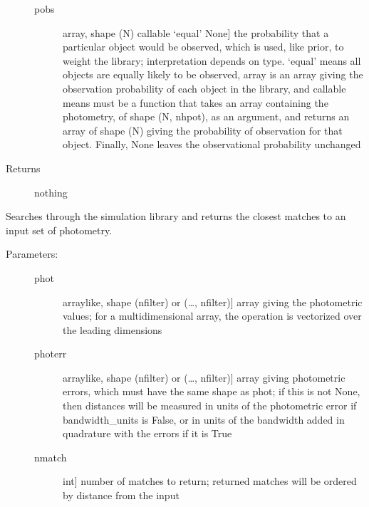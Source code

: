 \documentclass[letterpaper,10pt,english]{sphinxmanual}
\begin{document}
\begin{fulllineitems}
\begin{fulllineitems}
\begin{description}
\begin{description}
\item[{pobs}] \leavevmode{[}array, shape (N) \textbar{} callable \textbar{} ‘equal’ \textbar{} None{]}
the probability that a particular object would be observed,
which is used, like prior, to weight the library;
interpretation depends on type. ‘equal’ means all objects are
equally likely to be observed, array is an array giving the
observation probability of each object in the library, and
callable means must be a function that takes an array
containing the photometry, of shape (N, nhpot), as an
argument, and returns an array of shape (N) giving the
probability of observation for that object. Finally,
None leaves the observational probability unchanged

\end{description}

\item[{Returns}] \leavevmode
nothing

\end{description}

\end{fulllineitems}


\begin{fulllineitems}
\label{\detokenize{cluster_slug:slugpy.cluster_slug.cluster_slug.bestmatch}}
Searches through the simulation library and returns the closest
matches to an input set of photometry.
\begin{description}
\item[{Parameters:}] \leavevmode\begin{description}
\item[{phot}] \leavevmode{[}arraylike, shape (nfilter) or (…, nfilter){]}
array giving the photometric values; for a
multidimensional array, the operation is vectorized over
the leading dimensions

\item[{photerr}] \leavevmode{[}arraylike, shape (nfilter) or (…, nfilter){]}
array giving photometric errors, which must have the
same shape as phot; if this is not None,
then distances will be measured in units of the
photometric error if bandwidth\_units is False, or in
units of the bandwidth added in quadrature with the
errors if it is True

\item[{nmatch}] \leavevmode{[}int{]}
number of matches to return; returned matches will be
ordered by distance from the input


\end{description}
\end{description}
\end{fulllineitems}
\end{fulllineitems}
\end{document}
